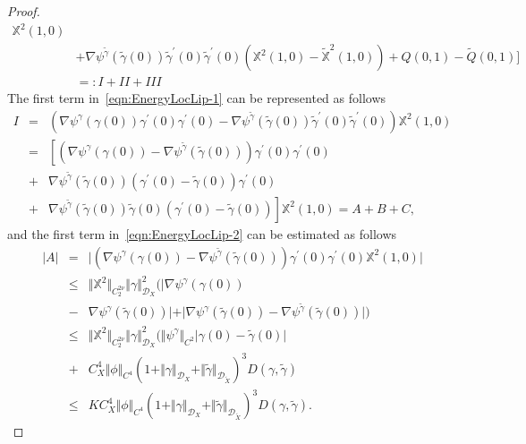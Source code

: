 \documentclass[11pt,a4paper,reqno]{amsart}%
\theoremstyle{plain}
\theoremstyle{remark}
\theoremstyle{plain}
\numberwithin{equation}{section}
\begin{document}
\begin{proof}
\begin{align}
\mathbb{X}^2(1,0)\nonumber\\
&+\nabla\psi^{\tilde{\gamma}}(\tilde{\gamma}(0))\tilde{\gamma}^\prime(0)\tilde{\gamma}^\prime(0)(\mathbb{X}^2(1,0)-\mathbb{\tilde{X}}^2(1,0))
+Q(0,1)-\tilde{Q}(0,1)\Big]\!
\nonumber\\
 &=:\!I\! +\! II\! +\! III
\end{align}
The first term in~\eqref{eqn:EnergyLocLip-1} can be represented as
follows
\begin{eqnarray}
I &=&
(\nabla\psi^{\gamma}(\gamma(0))\gamma^\prime(0)\gamma^\prime(0)-\nabla\psi^{\tilde{\gamma}}(\tilde{\gamma}(0))\tilde{\gamma}^\prime(0)\tilde{\gamma}^\prime(0))
\mathbb{X}^2(1,0)\nonumber\\
 &=& \left[(\nabla\psi^{\gamma}(\gamma(0))-\nabla\psi^{\tilde{\gamma}}(\tilde{\gamma}(0)))\gamma^\prime(0)\gamma^\prime(0)\right.\nonumber\\
 &+& \nabla\psi^{\tilde{\gamma}}(\tilde{\gamma}(0))(\gamma^\prime(0)-\tilde{\gamma}(0))\gamma^\prime(0)\nonumber\\
 &+& \left.\nabla\psi^{\tilde{\gamma}}(\tilde{\gamma}(0))\tilde{\gamma}(0)(\gamma^\prime(0)-\tilde{\gamma}(0))\right]\mathbb{X}^2(1,0)=A+B+C ,\label{eqn:EnergyLocLip-2}
\end{eqnarray}
and the first term in~\eqref{eqn:EnergyLocLip-2} can be estimated as
follows
\begin{eqnarray}\label{eqn:EnergyLocLip-3}
\vert A\vert &=&\vert (\nabla\psi^{\gamma}(\gamma(0))-\nabla\psi^{\tilde{\gamma}}(\tilde{\gamma}(0)))\gamma^\prime(0)\gamma^\prime(0)\mathbb{X}^2(1,0)\vert \\
&\leq&
\Vert \mathbb{X}^2\Vert_{C_2^{2\nu}}\Vert \gamma\Vert_{\mathcal{D}_X}^2(\vert \nabla\psi^{\gamma}
(\gamma(0))\nonumber\\
&-&\nabla\psi^{\gamma}(\tilde{\gamma}(0))\vert +\vert \nabla\psi^{\gamma}(\tilde{\gamma}(0))-\nabla\psi^{\tilde{\gamma}}(\tilde{\gamma}(0))\vert )\nonumber\\
&\leq &\Vert \mathbb{X}^2\Vert_{C_2^{2\nu}}\Vert \gamma\Vert_{\mathcal{D}_X}^2(\Vert \psi^{\gamma}\Vert_{C^2}\vert \gamma(0)-\tilde{\gamma}(0)\vert
\nonumber\\
&+&C_X^4\Vert \phi\Vert_{C^4}(1+\Vert \gamma\Vert_{\mathcal{D}_X}+\Vert \tilde{\gamma}\Vert_{\mathcal{D}_{\tilde{X}}})^3 D( \gamma,\tilde{\gamma})
\nonumber\\
&\leq&
KC_X^4\Vert \phi\Vert_{C^4}(1+\Vert \gamma\Vert_{\mathcal{D}_X}+\Vert \tilde{\gamma}\Vert_{\mathcal{D}_{\tilde{X}}})^3 D( \gamma,\tilde{\gamma}).
\nonumber
\end{eqnarray}

\end{proof}
\end{document}
